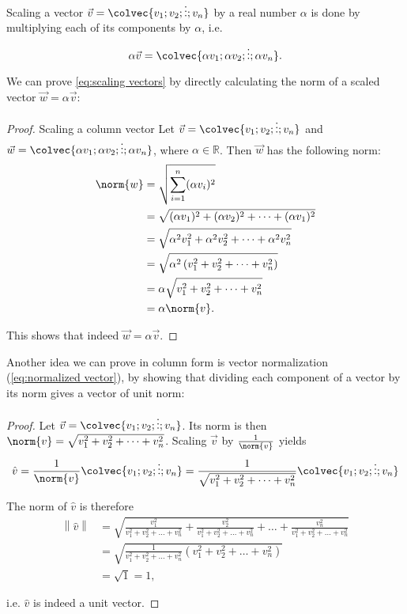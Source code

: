 Scaling a vector $\vec{v}=\colvec{v_{1};v_{2};\vdots;v_{n}}$ by a real number $\alpha$ is done by multiplying each of its components by $\alpha$, i.e.
\begin{equation}
	\alpha\vec{v} = \colvec{\alpha v_{1};\alpha v_{2};\vdots;\alpha v_{n}}.
	\label{eq:scaling vectors}
\end{equation}

We can prove \autoref{eq:scaling vectors} by directly calculating the norm of a scaled vector $\vec{w}=\alpha\vec{v}$:
\begin{proof}{Scaling a column vector}{}
	Let $\vec{v}=\colvec{v_{1};v_{2};\vdots;v_{n}}$ and $\vec{w}=\colvec{\alpha v_{1};\alpha v_{2};\vdots;\alpha v_{n}}$, where $\alpha\in\mathbb{R}$. Then $\vec{w}$ has the following norm:
	\begin{align*}
		\norm{w} &= \sqrt{\sum\limits_{i=1}^{n}(\alpha v_{i})^{2}}\\
		&= \sqrt{(\alpha v_{1})^{2} + (\alpha v_{2})^{2} + \dots + (\alpha v_{1})^{2}}\\
		&= \sqrt{\alpha^{2}v_{1}^{2} + \alpha^{2}v_{2}^{2} + \dots + \alpha^{2}v_{n}^{2}}\\
		&= \sqrt{\alpha^{2}\left( v_{1}^{2} + v_{2}^{2} + \dots + v_{n}^{2} \right)}\\
		&= \alpha\sqrt{v_{1}^{2} + v_{2}^{2} + \dots + v_{n}^{2}}\\
		&= \alpha\norm{v}.
	\end{align*}

	This shows that indeed $\vec{w}=\alpha\vec{v}$.
\end{proof}

Another idea we can prove in column form is vector normalization (\autoref{eq:normalized vector}), by showing that dividing each component of a vector by its norm gives a vector of unit norm:
\begin{proof}
	Let $\vec{v}=\colvec{v_{1};v_{2};\vdots;v_{n}}$. Its norm is then $\norm{v}=\sqrt{v_{1}^{2}+v_{2}^{2}+\dots+v_{n}^{2}}$. Scaling $\vec{v}$ by $\frac{1}{\norm{v}}$ yields
	\begin{equation*}
		\hat{v} = \frac{1}{\norm{v}}\colvec{v_{1};v_{2};\vdots;v_{n}} = \frac{1}{\sqrt{v_{1}^{2}+v_{2}^{2}+\dots+v_{n}^{2}}}\colvec{v_{1};v_{2};\vdots;v_{n}}
	\end{equation*}

	The norm of $\hat{v}$ is therefore
	\begin{align*}
		\left\| \hat{v} \right\| &= \sqrt{\frac{v_{1}^{2}}{v_{1}^{2}+v_{2}^{2}+\dots+v_{n}^{2}} + \frac{v_{2}^{2}}{v_{1}^{2}+v_{2}^{2}+\dots+v_{n}^{2}} + \dots + \frac{v_{n}^{2}}{v_{1}^{2}+v_{2}^{2}+\dots+v_{n}^{2}}}\\
		&= \sqrt{\frac{1}{v_{1}^{2}+v_{2}^{2}+\dots+v_{n}^{2}}\left(v_{1}^{2}+v_{2}^{2}+\dots+v_{n}^{2} \right)}\\
		&= \sqrt{1} = 1,
	\end{align*}

	i.e. $\hat{v}$ is indeed a unit vector.
\end{proof}

